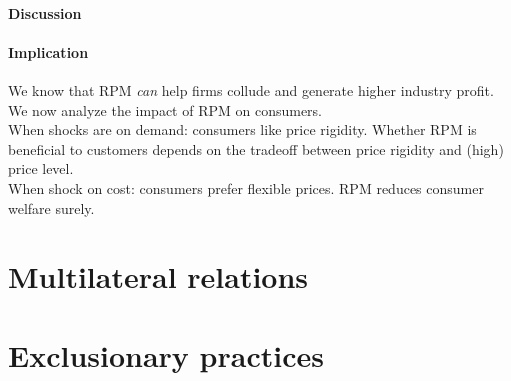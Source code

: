 \paragraph{Discussion}
\paragraph{Implication}
We know that RPM \emph{can} help firms collude and generate higher industry profit. We now analyze the impact of RPM on consumers. \\
When shocks are on demand: consumers like price rigidity. Whether RPM is beneficial to customers depends on the tradeoff between price rigidity and (high) price level.\\
When shock on cost: consumers prefer flexible prices. RPM reduces consumer welfare surely. 

\section{Multilateral relations}
\section{Exclusionary practices}


